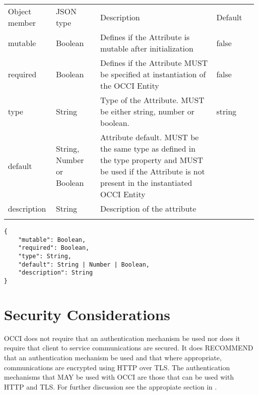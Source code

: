 \documentclass[10pt,a4paper]{article}
\begin{document}
 {
    \begin{tabularx}{\textwidth}{llXll}
    \toprule
    Object member & JSON type & Description & Default \\
    \colrule
    mutable & Boolean & Defines if the Attribute is mutable after initialization
& false \\

    required & Boolean & Defines if the Attribute MUST be specified at
instantiation of the OCCI Entity & false \\

    type & String & Type of the Attribute. MUST be either string, number or
boolean. & string \\


    default & String, Number or Boolean & Attribute default. MUST be the same
type as defined in the type property and MUST  be used if the Attribute is not
present in the instantiated OCCI Entity & \\

    description & String & Description of the attribute & \\
    \botrule
    \end{tabularx}
}
\begin{lstlisting}
{
    "mutable": Boolean,
    "required": Boolean,
    "type": String,
    "default": String | Number | Boolean,
    "description": String
}
\end{lstlisting}

\section{Security Considerations}
OCCI does not require that an authentication mechanism be used nor
does it require that client to service communications are secured. It
does RECOMMEND that an authentication mechanism be used and that where
appropriate, communications are encrypted using HTTP over TLS. The
authentication mechanisms that MAY be used with OCCI are those that
can be used with HTTP and TLS. For further discussion see the 
appropiate section in \cite{occi:protocol}.
\end{document}
